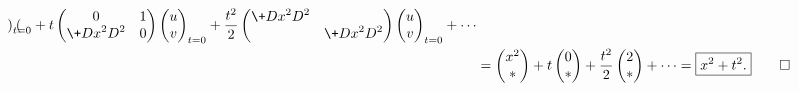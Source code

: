 \documentclass[hidelinks]{ctexart}
\begin{document}
\begin{solution}
\begin{align*}
\begin{pmatrix}
        \end{pmatrix}_{t=0} + t\begin{pmatrix}
            0 & 1 \\
            \displaystyle \+D{x^2}D{^2} & 0
        \end{pmatrix}\begin{pmatrix}
            u \\ v
        \end{pmatrix}_{t=0} + \frac{t^2}{2}\begin{pmatrix}
            \displaystyle \+D{x^2}D{^2} & \\
            & \displaystyle \+D{x^2}D{^2}
        \end{pmatrix}\begin{pmatrix}
            u \\ v
        \end{pmatrix}_{t=0} + \cdots \\
        &= \begin{pmatrix}
            x^2 \\ *
        \end{pmatrix} + t\begin{pmatrix}
            0 \\ *
        \end{pmatrix} + \frac{t^2}{2} \begin{pmatrix}
            2 \\ *
        \end{pmatrix} + \cdots = \boxed{x^2 + t^2.} \qedhere
    \end{align*}
\end{solution}

\end{document}
